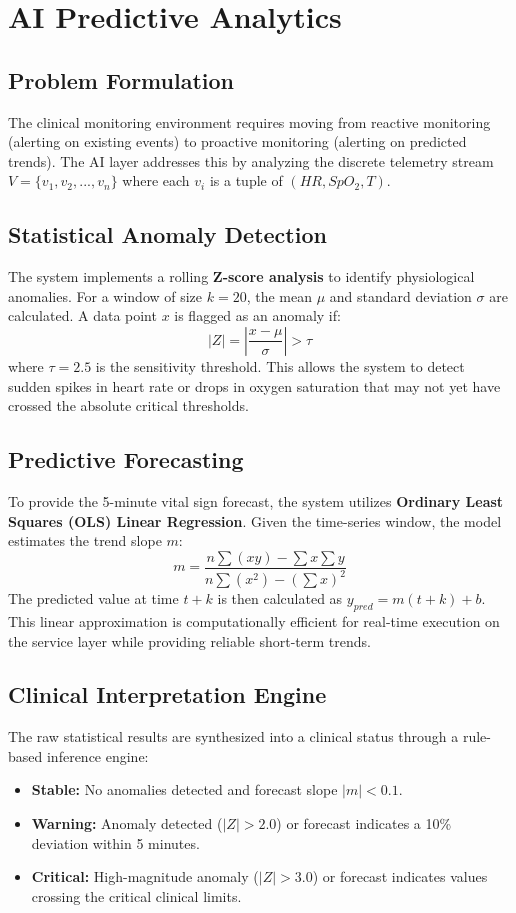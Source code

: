 \chapter{AI Predictive Analytics}
\label{ch:ai_predictive}

\section{Problem Formulation}
The clinical monitoring environment requires moving from reactive monitoring (alerting on existing events) to proactive monitoring (alerting on predicted trends). The AI layer addresses this by analyzing the discrete telemetry stream $V = \{v_1, v_2, ..., v_n\}$ where each $v_i$ is a tuple of $(HR, SpO_2, T)$.

\section{Statistical Anomaly Detection}
The system implements a rolling \textbf{Z-score analysis} to identify physiological anomalies. For a window of size $k=20$, the mean $\mu$ and standard deviation $\sigma$ are calculated. A data point $x$ is flagged as an anomaly if:
\begin{equation}
    |Z| = \left| \frac{x - \mu}{\sigma} \right| > \tau
\end{equation}
where $\tau = 2.5$ is the sensitivity threshold. This allows the system to detect sudden spikes in heart rate or drops in oxygen saturation that may not yet have crossed the absolute critical thresholds.

\section{Predictive Forecasting}
To provide the 5-minute vital sign forecast, the system utilizes \textbf{Ordinary Least Squares (OLS) Linear Regression}. Given the time-series window, the model estimates the trend slope $m$:
\begin{equation}
    m = \frac{n\sum(xy) - \sum x \sum y}{n\sum(x^2) - (\sum x)^2}
\end{equation}
The predicted value at time $t+k$ is then calculated as $y_{pred} = m(t+k) + b$. This linear approximation is computationally efficient for real-time execution on the service layer while providing reliable short-term trends.

\section{Clinical Interpretation Engine}
The raw statistical results are synthesized into a clinical status through a rule-based inference engine:
\begin{itemize}
    \item \textbf{Stable:} No anomalies detected and forecast slope $|m| < 0.1$.
    \item \textbf{Warning:} Anomaly detected ($|Z| > 2.0$) or forecast indicates a 10\% deviation within 5 minutes.
    \item \textbf{Critical:} High-magnitude anomaly ($|Z| > 3.0$) or forecast indicates values crossing the critical clinical limits.
\end{itemize}

